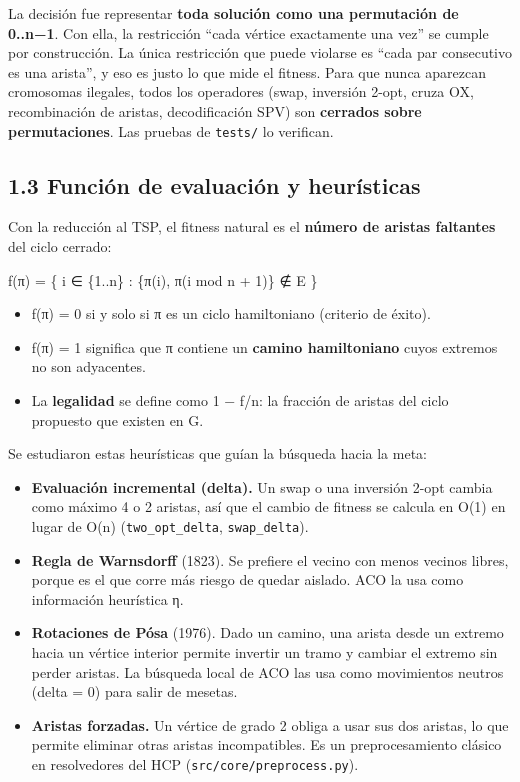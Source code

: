 \documentclass[
  spanish,
  11pt,
]{article}
\providecommand{\tightlist}{%
  \setlength{\itemsep}{0pt}\setlength{\parskip}{0pt}}
\begin{document}
La decisión fue representar \textbf{toda solución como una permutación
de 0..n−1}. Con ella, la restricción ``cada vértice exactamente una
vez'' se cumple por construcción. La única restricción que puede
violarse es ``cada par consecutivo es una arista'', y eso es justo lo
que mide el fitness. Para que nunca aparezcan cromosomas ilegales, todos
los operadores (swap, inversión 2-opt, cruza OX, recombinación de
aristas, decodificación SPV) son \textbf{cerrados sobre permutaciones}.
Las pruebas de \texttt{tests/} lo verifican.

\subsection{1.3 Función de evaluación y
heurísticas}\label{funciuxf3n-de-evaluaciuxf3n-y-heuruxedsticas}

Con la reducción al TSP, el fitness natural es el \textbf{número de
aristas faltantes} del ciclo cerrado:

f(π) = \textbar\{ i ∈ \{1..n\} : \{π(i), π(i mod n + 1)\} ∉ E
\}\textbar{}

\begin{itemize}
\tightlist
\item
  f(π) = 0 si y solo si π es un ciclo hamiltoniano (criterio de éxito).
\item
  f(π) = 1 significa que π contiene un \textbf{camino hamiltoniano}
  cuyos extremos no son adyacentes.
\item
  La \textbf{legalidad} se define como 1 − f/n: la fracción de aristas
  del ciclo propuesto que existen en G.
\end{itemize}

Se estudiaron estas heurísticas que guían la búsqueda hacia la meta:

\begin{itemize}
\tightlist
\item
  \textbf{Evaluación incremental (delta).} Un swap o una inversión 2-opt
  cambia como máximo 4 o 2 aristas, así que el cambio de fitness se
  calcula en O(1) en lugar de O(n) (\texttt{two\_opt\_delta},
  \texttt{swap\_delta}).
\item
  \textbf{Regla de Warnsdorff} (1823). Se prefiere el vecino con menos
  vecinos libres, porque es el que corre más riesgo de quedar aislado.
  ACO la usa como información heurística η.
\item
  \textbf{Rotaciones de Pósa} (1976). Dado un camino, una arista desde
  un extremo hacia un vértice interior permite invertir un tramo y
  cambiar el extremo sin perder aristas. La búsqueda local de ACO las
  usa como movimientos neutros (delta = 0) para salir de mesetas.
\item
  \textbf{Aristas forzadas.} Un vértice de grado 2 obliga a usar sus dos
  aristas, lo que permite eliminar otras aristas incompatibles. Es un
  preprocesamiento clásico en resolvedores del HCP
  (\texttt{src/core/preprocess.py}).
\end{itemize}
\end{document}
